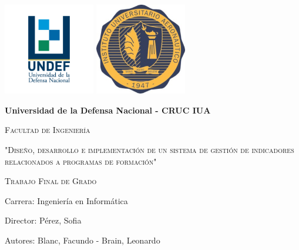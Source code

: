 \begin{titlepage}
	\centering
	\includegraphics[width=0.3\textwidth]{imagenes/undef}
	\includegraphics[width=0.3\textwidth]{imagenes/iua}\\
	\vspace{1cm}
	{\bfseries\LARGE Universidad de la Defensa Nacional - CRUC IUA \par}
	\vspace{1cm}
	{\scshape\Large Facultad de Ingenier\'ia \par}
	\vspace{2cm}
	{\scshape\Large "Diseño, desarrollo e implementación de un sistema de gestión de indicadores relacionados a programas de formación" \par}
	\vspace{1cm}
	{\scshape\Large Trabajo Final de Grado \par}
	\begin{flushleft}
	\vfill
	\vspace{0.5cm}
	{\Large Carrera: Ingeniería en Informática\par}
	\vspace{0.5cm}
	{\Large Director: Pérez, Sofia\par}
	\vspace{0.5cm}
	{\Large Autores: Blanc, Facundo - Brain, Leonardo\par}
	\vfill
	\end{flushleft}
\end{titlepage}